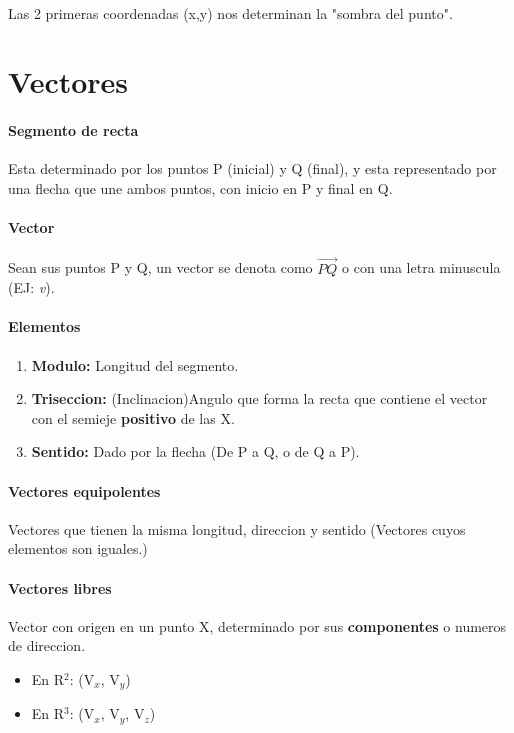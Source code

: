 \documentclass[11pt]{article}
\begin{document}
\paragraph{}
Las 2 primeras coordenadas (x,y) nos determinan la "sombra del punto".

\section{Vectores}

\paragraph{Segmento de recta}
Esta determinado por los puntos P (inicial) y Q (final), y esta representado por una flecha que une ambos puntos, con inicio en P y final en Q.
\paragraph{Vector}
Sean sus puntos P y Q, un vector se denota como $\overrightarrow{PQ}$ o con una letra minuscula (EJ: \emph{v}).
\paragraph{Elementos}
\begin{enumerate}
	\item \textbf{Modulo: } Longitud del segmento.
	\item \textbf{Triseccion: } (Inclinacion)Angulo que forma la recta que contiene el vector con el semieje \textbf{positivo} de las X.
	\item \textbf{Sentido: } Dado por la flecha (De P a Q, o de Q a P).
\end{enumerate}

\paragraph{Vectores equipolentes}
Vectores que tienen la misma longitud, direccion y sentido (Vectores cuyos elementos son iguales.)

\pagebreak

\paragraph{Vectores libres}
 Vector con origen en un punto X, determinado por sus \textbf{componentes} o numeros de direccion.
\begin{itemize}
	\item En R$^2$: (V$_x$, V$_y$)
	\item En R$^3$: (V$_x$, V$_y$, V$_z$)
\end{itemize}
\end{document}
